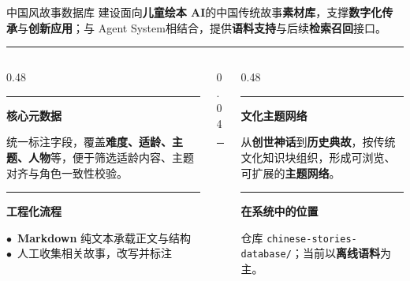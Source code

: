 \documentclass{beamer}
\newcommand{\goldrule}{\par\vspace{3pt}\noindent\textcolor{accentgold!60}{\rule{\linewidth}{0.4pt}}\par\vspace{3pt}}
\newcommand{\sidehead}[2][buptred]{%
  {\color{#1}\rule[-0.15em]{2.5pt}{1.0em}}\hspace{0.45em}\textbf{\small\color{darkred}#2}\par
  \vspace{2pt}%
}
\newcommand{\redot}{\textcolor{buptred}{\scriptsize$\bullet$}~}
\begin{document}
\begin{frame}[t]{中国风故事数据库}
    \vspace{-0.05cm}
    \footnotesize
    建设面向\textbf{儿童绘本 AI}的中国传统故事\textbf{素材库}，支撑\textbf{数字化传承}与\textbf{创新应用}；与 Agent System相结合，提供\textbf{语料支持}与后续\textbf{检索召回}接口。
    \goldrule
    \vspace{0.08cm}
    \begin{columns}[T, onlytextwidth]
        \begin{column}[T]{0.48\linewidth}
            \sidehead{核心元数据}
            \scriptsize
            统一标注字段，覆盖\textbf{难度、适龄、主题、人物}等，便于筛选适龄内容、主题对齐与角色一致性校验。
            \vspace{0.32cm}

            \sidehead[accentgold]{工程化流程}
            \scriptsize
            \redot \textbf{Markdown} 纯文本承载正文与结构\\[2pt]
            \redot 人工收集相关故事，改写并标注
        \end{column}
        \begin{column}[T]{0.04\linewidth}
            \centering\textcolor{accentgold!60}{\rule{0.4pt}{5.4em}}
        \end{column}
        \begin{column}[T]{0.48\linewidth}
            \sidehead[accentgold]{文化主题网络}
            \scriptsize
            从\textbf{创世神话}到\textbf{历史典故}，按传统文化知识块组织，形成可浏览、可扩展的\textbf{主题网络}。
            \vspace{0.32cm}

            \sidehead{在系统中的位置}
            \scriptsize
            仓库 \texttt{chinese-stories-database/}；当前以\textbf{离线语料}为主。
        \end{column}
    \end{columns}
\end{frame}
\end{document}
